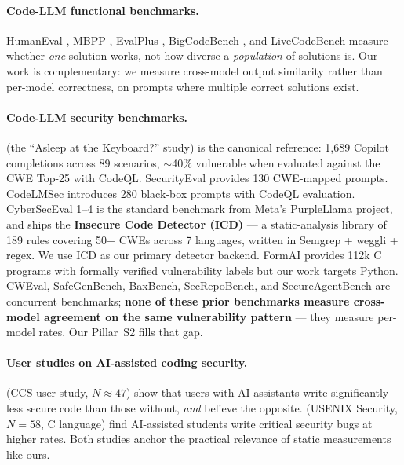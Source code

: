 \documentclass{article}
\begin{document}
\paragraph{Code-LLM functional benchmarks.}
HumanEval \citep{chen2021humaneval}, MBPP \citep{austin2021mbpp},
EvalPlus \citep{liu2023evalplus}, BigCodeBench \citep{zhuo2025bigcodebench},
and LiveCodeBench \citep{jain2024livecodebench} measure whether \emph{one}
solution works, not how diverse a \emph{population} of solutions is. Our work
is complementary: we measure cross-model output similarity rather than
per-model correctness, on prompts where multiple correct solutions exist.

\paragraph{Code-LLM security benchmarks.}
\citet{pearce2022asleep} (the ``Asleep at the Keyboard?'' study) is the
canonical reference: 1{,}689 Copilot completions across 89 scenarios,
$\sim$40\% vulnerable when evaluated against the CWE Top-25 with CodeQL.
SecurityEval \citep{siddiq2022securityeval} provides 130 CWE-mapped prompts.
CodeLMSec \citep{hajipour2024codelmsec} introduces 280 black-box prompts with
CodeQL evaluation. CyberSecEval 1--4 \citep{bhatt2023cyberseceval} is the
standard benchmark from Meta's PurpleLlama project, and ships the
\textbf{Insecure Code Detector (ICD)} --- a static-analysis library of 189
rules covering 50+ CWEs across 7 languages, written in Semgrep + weggli +
regex. We use ICD as our primary detector backend. FormAI
\citep{tihanyi2023formai} provides 112k C programs with formally verified
vulnerability labels but our work targets Python. CWEval, SafeGenBench,
BaxBench, SecRepoBench, and SecureAgentBench
\citep{cweval2024,safegenbench2025,baxbench2025,secrepobench2025,secureagentbench2025}
are concurrent benchmarks; \textbf{none of these prior benchmarks measure
cross-model agreement on the same vulnerability pattern} --- they measure
per-model rates. Our Pillar~S2 fills that gap.

\paragraph{User studies on AI-assisted coding security.}
\citet{perry2023insecure} (CCS user study, $N\approx 47$) show that users with
AI assistants write significantly less secure code than those without,
\emph{and} believe the opposite. \citet{sandoval2023lostatc} (USENIX Security,
$N=58$, C language) find AI-assisted students write critical security bugs at
higher rates. Both studies anchor the practical relevance of static
measurements like ours.
\end{document}
